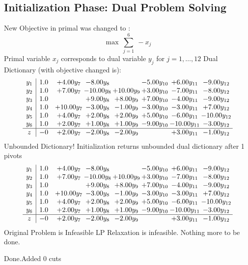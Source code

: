 \documentclass[8pt]{article}
\begin{document}
\subsection{Initialization Phase: Dual Problem Solving}
New Objective in primal was changed to : \[ \max\ \sum_{j=1}^{6}\ - x_j \] 
Primal variable $x_j$ corresponds to dual variable $y_j$ for $j = 1,\ldots,12$
Dual Dictionary (with objective changed is): 
\[\begin{array}{c| c c@{\hskip 2pt} c@{\hskip 2pt} c@{\hskip 2pt} c@{\hskip 2pt} c@{\hskip 2pt} c@{\hskip 2pt} }
 y_{1}   &  1.0 & +  4.00 y_{7} & -8.00 y_{8} &   & -5.00 y_{10} & +  6.00 y_{11} & -9.00 y_{12}\\
 y_{2}   &  1.0 & +  7.00 y_{7} & -10.00 y_{8} & + 10.00 y_{9} & +  3.00 y_{10} & -7.00 y_{11} & -8.00 y_{12}\\
 y_{3}   &  1.0  &   & +  9.00 y_{8} & +  8.00 y_{9} & +  7.00 y_{10} & -4.00 y_{11} & -9.00 y_{12}\\
 y_{4}   &  1.0 & + 10.00 y_{7} & -3.00 y_{8} & -1.00 y_{9} & -3.00 y_{10} & -3.00 y_{11} & +  7.00 y_{12}\\
 y_{5}   &  1.0 & +  4.00 y_{7} & +  2.00 y_{8} & +  2.00 y_{9} & +  5.00 y_{10} & -6.00 y_{11} & -10.00 y_{12}\\
 y_{6}   &  1.0 & +  2.00 y_{7} & +  1.00 y_{8} & +  1.00 y_{9} & -9.00 y_{10} & -10.00 y_{11} & -3.00 y_{12}\\
\hline
z    &  -0 & +  2.00 y_{7} & -2.00 y_{8} & -2.00 y_{9} &   & +  3.00 y_{11} & -1.00 y_{12}\\
\end{array}\]
Unbounded Dictionary!
Initialization returns unbounded dual dictionary after 1 pivots
\[\begin{array}{c| c c@{\hskip 2pt} c@{\hskip 2pt} c@{\hskip 2pt} c@{\hskip 2pt} c@{\hskip 2pt} c@{\hskip 2pt} }
 y_{1}   &  1.0 & +  4.00 y_{7} & -8.00 y_{8} &   & -5.00 y_{10} & +  6.00 y_{11} & -9.00 y_{12}\\
 y_{2}   &  1.0 & +  7.00 y_{7} & -10.00 y_{8} & + 10.00 y_{9} & +  3.00 y_{10} & -7.00 y_{11} & -8.00 y_{12}\\
 y_{3}   &  1.0  &   & +  9.00 y_{8} & +  8.00 y_{9} & +  7.00 y_{10} & -4.00 y_{11} & -9.00 y_{12}\\
 y_{4}   &  1.0 & + 10.00 y_{7} & -3.00 y_{8} & -1.00 y_{9} & -3.00 y_{10} & -3.00 y_{11} & +  7.00 y_{12}\\
 y_{5}   &  1.0 & +  4.00 y_{7} & +  2.00 y_{8} & +  2.00 y_{9} & +  5.00 y_{10} & -6.00 y_{11} & -10.00 y_{12}\\
 y_{6}   &  1.0 & +  2.00 y_{7} & +  1.00 y_{8} & +  1.00 y_{9} & -9.00 y_{10} & -10.00 y_{11} & -3.00 y_{12}\\
\hline
z    &  -0 & +  2.00 y_{7} & -2.00 y_{8} & -2.00 y_{9} &   & +  3.00 y_{11} & -1.00 y_{12}\\
\end{array}\]
Original Problem is Infeasible
 LP Relaxation is infeasible. Nothing more to be done. 

Done.Added 0 cuts 
\end{document}
